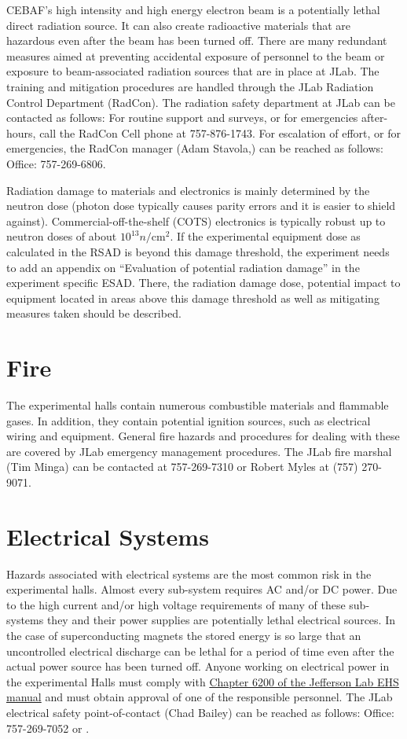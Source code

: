 CEBAF's high intensity and high energy electron beam is a potentially lethal direct radiation source. 
It can also create radioactive materials that are hazardous even  after the beam has been turned off. 
There are many redundant measures aimed at preventing accidental exposure of personnel to the beam 
or exposure to beam-associated radiation sources that are in place at JLab. The training and mitigation 
procedures are handled through the JLab Radiation Control Department (RadCon). The radiation safety department at JLab can be contacted as follows: For routine support and surveys, or for emergencies after-hours, call the RadCon Cell phone at 757-876-1743. For escalation of effort, or for emergencies, the RadCon manager (Adam Stavola,) can be reached as follows: Office: 757-269-6806.

Radiation damage to materials and electronics is mainly determined by the neutron 
dose (photon dose typically causes parity errors and it is easier to shield against). 
Commercial-off-the-shelf (COTS) electronics is typically robust up to neutron 
doses of about $10^{13} n/\textrm{cm}^2$. If the experimental equipment dose as calculated 
in the RSAD is beyond this damage threshold, the experiment needs to add 
an appendix on ``Evaluation of potential radiation damage'' in the experiment 
specific ESAD. There, the radiation damage dose, potential impact to equipment 
located in areas above this damage threshold as well as mitigating measures taken should be described.

\section{Fire}

	The experimental halls contain numerous combustible materials and flammable gases. 
In addition, they contain potential ignition sources, such as electrical wiring and equipment. 
General fire hazards and procedures for dealing with these are covered by JLab emergency 
management procedures. The JLab fire marshal (Tim Minga) can be contacted at 757-269-7310 or
Robert Myles at (757) 270-9071. %

\section{Electrical Systems}

	Hazards associated with electrical systems are the most common risk in the experimental halls. 
Almost every sub-system requires AC and/or DC power. Due to the high current and/or high voltage 
requirements of many of these sub-systems they and their power supplies are potentially lethal 
electrical sources. In the case of superconducting magnets the stored energy is so large that 
an uncontrolled electrical discharge can be lethal for a period of time even after the actual 
power source has been turned off.  Anyone working on electrical power in the experimental Halls 
must comply with \href{http://www.jlab.org/ehs/ehsmanual/manual/6200.html}{Chapter 6200 of the Jefferson Lab EHS manual}
and must obtain approval of one of the responsible personnel. 
The JLab electrical safety point-of-contact (Chad Bailey) can be reached as follows: Office: 757-269-7052 or .


